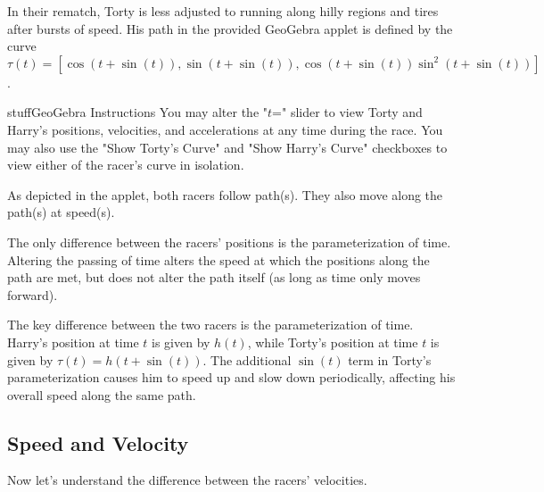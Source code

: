 \documentclass{ximera}
\begin{document}
In their rematch, Torty is less adjusted to running along hilly regions and tires after bursts of speed. His path in the provided GeoGebra applet is defined by the curve $\tau (t)=[ \cos(t+\sin(t)), \sin(t+\sin(t)), \cos(t+\sin(t))\sin^2(t+\sin(t))]$.

\begin{expandable}{stuff}{GeoGebra Instructions}
    You may alter the "$t$=" slider to view Torty and Harry's positions, velocities, and accelerations at any time during the race. You may also use the "Show Torty's Curve" and "Show Harry's Curve" checkboxes to view either of the racer's curve in isolation.
\end{expandable}

\begin{center}
\end{center}

\begin{problem}
    As depicted in the applet, both racers follow  path(s). They also move along the path(s) at  speed(s).

    \begin{feedback}
        The only difference between the racers' positions is the parameterization of time. Altering the passing of time alters the speed at which the positions along the path are met, but does not alter the path itself (as long as time only moves forward).
    \end{feedback}
\end{problem}

\begin{remark}
    The key difference between the two racers is the parameterization of time. Harry's position at time $t$ is given by $h(t)$, while Torty's position at time $t$ is given by $\tau(t)=h(t+\sin(t))$. The additional $\sin(t)$ term in Torty's parameterization causes him to speed up and slow down periodically, affecting his overall speed along the same path.
\end{remark}

\subsection*{Speed and Velocity}

Now let's understand the difference between the racers' velocities. 
\end{document}
